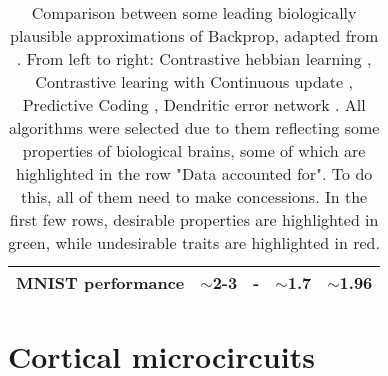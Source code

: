 \begin{table}[]
{\begin{tabular}{|ll|ll|ll|}
  \multicolumn{2}{|l|}{MNIST performance}                          & \multicolumn{1}{l|}{$\sim$2-3}
  & -                                                                                  & \multicolumn{1}{l|}{$\sim$1.7}
  & $\sim$1.96                                                                      \\ \hline
  \end{tabular}%
  }\caption{ Comparison between some leading biologically plausible approximations of Backprop, adapted from
    \cite{whittington2019theories}. From left to right: Contrastive hebbian learning \citep{OReilly1996}, Contrastive
    learing with Continuous update \citep{Bengio2017}, Predictive Coding \citep{Whittington2017,rao1999predictive},
    Dendritic error network \citep{sacramento2018dendritic}. All algorithms were selected due to them reflecting 
    some properties of biological brains, some of which are highlighted in the row "Data accounted for". To do this,
    all of them need to make concessions. In the first few rows, desirable properties are highlighted in green, while 
    undesirable traits are highlighted in red.}
  \end{table}



\section{Cortical microcircuits}
